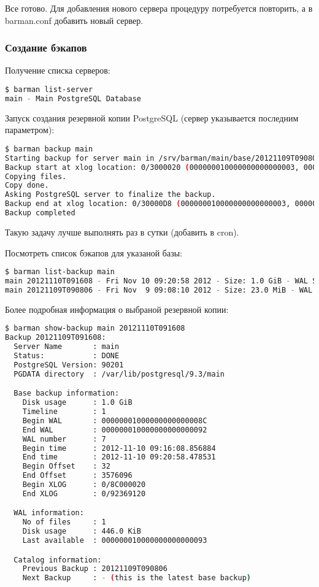 Все готово. Для добавления нового сервера процедуру потребуется повторить, а в barman.conf добавить новый сервер.

\subsubsection{Создание бэкапов}

Получение списка серверов:

\begin{lstlisting}[language=Bash,label=lst:barman12,caption=Список серверов]
$ barman list-server
main - Main PostgreSQL Database
\end{lstlisting}

Запуск создания резервной копии PostgreSQL (сервер указывается последним параметром):

\begin{lstlisting}[language=Bash,label=lst:barman13,caption=Создание бэкапа]
$ barman backup main
Starting backup for server main in /srv/barman/main/base/20121109T090806
Backup start at xlog location: 0/3000020 (000000010000000000000003, 00000020)
Copying files.
Copy done.
Asking PostgreSQL server to finalize the backup.
Backup end at xlog location: 0/30000D8 (000000010000000000000003, 000000D8)
Backup completed
\end{lstlisting}

Такую задачу лучше выполнять раз в сутки (добавить в cron).

Посмотреть список бэкапов для указаной базы:

\begin{lstlisting}[language=Bash,label=lst:barman14,caption=Список бэкапов]
$ barman list-backup main
main 20121110T091608 - Fri Nov 10 09:20:58 2012 - Size: 1.0 GiB - WAL Size: 446.0 KiB
main 20121109T090806 - Fri Nov  9 09:08:10 2012 - Size: 23.0 MiB - WAL Size: 477.0 MiB
\end{lstlisting}

Более подробная информация о выбраной резервной копии:

\begin{lstlisting}[language=Bash,label=lst:barman15,caption=Информация о выбраной резервной копии]
$ barman show-backup main 20121110T091608
Backup 20121109T091608:
  Server Name       : main
  Status:           : DONE
  PostgreSQL Version: 90201
  PGDATA directory  : /var/lib/postgresql/9.3/main

  Base backup information:
    Disk usage      : 1.0 GiB
    Timeline        : 1
    Begin WAL       : 00000001000000000000008C
    End WAL         : 000000010000000000000092
    WAL number      : 7
    Begin time      : 2012-11-10 09:16:08.856884
    End time        : 2012-11-10 09:20:58.478531
    Begin Offset    : 32
    End Offset      : 3576096
    Begin XLOG      : 0/8C000020
    End XLOG        : 0/92369120

  WAL information:
    No of files     : 1
    Disk usage      : 446.0 KiB
    Last available  : 000000010000000000000093

  Catalog information:
    Previous Backup : 20121109T090806
    Next Backup     : - (this is the latest base backup)
\end{lstlisting}

